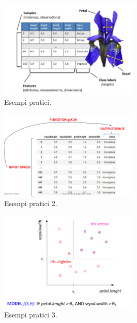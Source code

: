 \documentclass{../main.tex}[subfiles]
\begin{document}
\begin{figure}[H]
	\centering
	\includegraphics[width=0.6\textwidth]{pictures/esempioDefinizioni.png}
	\caption{Esempi pratici.}
\end{figure}
\begin{figure}[H]
	\centering
	\includegraphics[width=0.6\textwidth]{pictures/esempioDefinizioni2.png}
	\caption{Esempi pratici 2.}
\end{figure}
\begin{figure}[H]
	\centering
	\includegraphics[width=0.6\textwidth]{pictures/esempioDefinizioni3.png}
	\caption{Esempi pratici 3.}
\end{figure}
\end{document}
